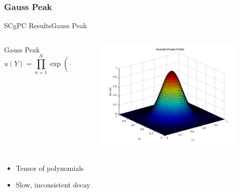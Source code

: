 \documentclass{beamer}
\begin{document}
\subsubsection{Gauss Peak}
\begin{frame}{SCgPC Results}{Gauss Peak}\vspace{-20pt}
  \begin{columns}
    \begin{column}{0.6\textwidth}
      \begin{block}{Gauss Peak}
        \[u(Y) = \prod_{n=1}^N \exp(-3^2(y_n-0.5)^2)\]
      \end{block}
    \end{column}
    \begin{column}{0.4\textwidth}
        \begin{figure}[h!]
          \centering
          \includegraphics[width=\linewidth]{anlmodels/gaussian}
        \end{figure}
    \end{column}
  \end{columns}
  \begin{itemize}
    \item Tensor of polynomials
    \item Slow, inconsistent decay
  \end{itemize}
\end{frame}
\end{document}
